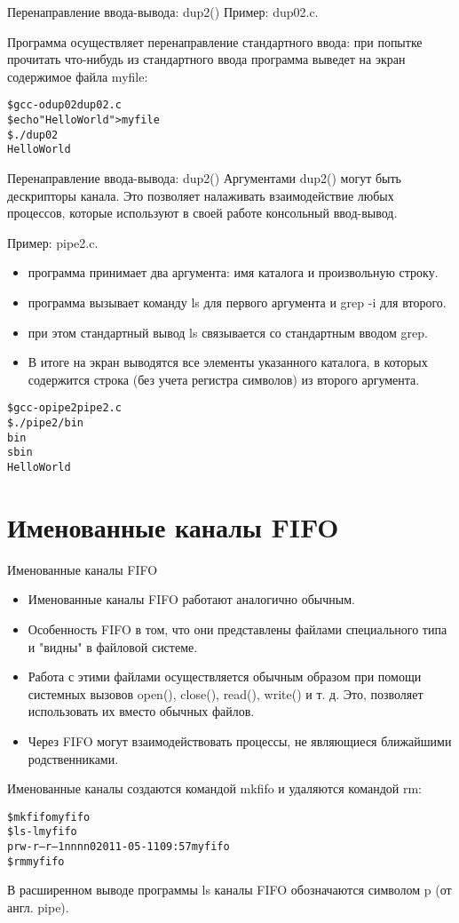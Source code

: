 \documentclass{beamer}
\begin{document}
\begin{frame}[fragile]{Перенаправление ввода-вывода: dup2()}
Пример: dup02.c. 

Программа осуществляет перенаправление стандартного ввода: при попытке прочитать что-нибудь из стандартного ввода программа выведет на экран содержимое файла myfile:
\begin{alltt}
\$ gcc -o dup02 dup02.c
\$ echo "Hello World" > myfile
\$ ./dup02
Hello World
\end{alltt}
\end{frame}


\begin{frame}[fragile]{Перенаправление ввода-вывода: dup2()}
Аргументами dup2() могут быть дескрипторы канала. Это позволяет налаживать взаимодействие любых процессов, которые используют в своей работе консольный ввод-вывод. 

Пример: pipe2.c. 
\begin{itemize}
\item программа принимает два аргумента: имя каталога и произвольную строку. 
\item программа вызывает команду ls для первого аргумента и grep -i для второго. 
\item при этом стандартный вывод ls связывается со стандартным вводом grep. 
\item В итоге на экран выводятся все элементы указанного каталога, в которых содержится строка (без учета регистра символов) из второго аргумента.
\end{itemize}
\begin{alltt}
\$ gcc -o pipe2 pipe2.c
\$ ./pipe2 / bin
bin
sbin
Hello World
\end{alltt}
\end{frame}

\section{Именованные каналы FIFO}

\begin{frame}[fragile]{Именованные каналы FIFO}
\begin{itemize}
\item Именованные каналы FIFO работают аналогично обычным. 
\item Особенность FIFO в том, что они представлены файлами специального типа и "видны" в файловой системе. 
\item Работа с этими файлами осуществляется обычным образом при помощи системных вызовов open(), close(), read(), write() и т. д. Это, позволяет использовать их вместо обычных файлов. 
\item Через FIFO могут взаимодействовать процессы, не являющиеся ближайшими родственниками.
\end{itemize}

Именованные каналы создаются командой mkfifo и удаляются командой rm:
\begin{alltt}
\$ mkfifo myfifo
\$ ls -l myfifo
prw-r--r-- 1 nn nn 0 2011-05-11 09:57 myfifo
\$ rm myfifo
\end{alltt}
В расширенном выводе программы ls каналы FIFO обозначаются символом p (от англ. pipe). 
\end{frame}
\end{document}
